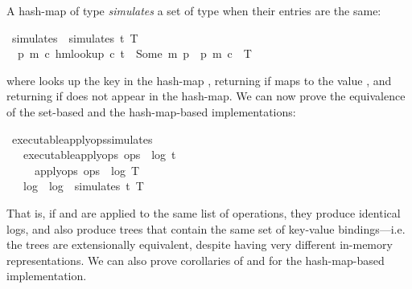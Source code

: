 \documentclass[10pt,journal,compsoc]{IEEEtran}
\renewenvironment{isabelle}{%
  \medbreak\indent%
  \renewcommand{\isanewline}{\\}%
  \begin{minipage}{\columnwidth}%
  \begin{isabellebody}%
  \begin{tabbing}%
}{%
  \end{tabbing}%
  \end{isabellebody}%
  \end{minipage}%
  \medbreak%
}
\renewcommand{\isacartoucheopen}{}
\renewcommand{\isacartoucheclose}{}
\begin{document}
A hash-map  of type  \emph{simulates} a set  of type  when their entries are the same:
\begin{isabelle}
\isamarkupfalse%
\ simulates\ \ {\isacartoucheopen}simulates\ t\ T\ {\isasymequiv}\isanewline
\ \ {\isacharparenleft}{\isasymforall}p\ m\ c{\isachardot}\ hm{\isachardot}lookup\ c\ t\ {\isacharequal}\ Some\ {\isacharparenleft}m{\isacharcomma}\ p{\isacharparenright}\ {\isasymlongleftrightarrow}\ {\isacharparenleft}p{\isacharcomma}\ m{\isacharcomma}\ c{\isacharparenright}\ {\isasymin}\ T{\isacharparenright}{\isacartoucheclose}
\end{isabelle}
\noindent where  looks up the key  in the hash-map , returning  if  maps to the value , and returning  if  does not appear in the hash-map.
We can now prove the equivalence of the set-based and the hash-map-based implementations:
\begin{isabelle}
\isamarkupfalse%
\ executable{\isacharunderscore}apply{\isacharunderscore}ops{\isacharunderscore}simulates{\isacharcolon}\isanewline
\ \ \ {\isacartoucheopen}executable{\isacharunderscore}apply{\isacharunderscore}ops\ ops\ {\isacharequal}\ {\isacharparenleft}log{}{\isacharcomma}\ t{\isacharparenright}{\isacartoucheclose}\isanewline
\ \ \ \ \ {\isacartoucheopen}apply{\isacharunderscore}ops\ ops\ {\isacharequal}\ {\isacharparenleft}log{}{\isacharcomma}\ T{\isacharparenright}{\isacartoucheclose}\isanewline
\ \ \ {\isacartoucheopen}log{}\ {\isacharequal}\ log{}\ {\isasymand}\ simulates\ t\ T{\isacartoucheclose}
\end{isabelle}

That is, if  and  are applied to the same list of operations, they produce identical logs, and also produce trees that contain the same set of key-value bindings---i.e. the trees are extensionally equivalent, despite having very different in-memory representations.
We can also prove corollaries of  and  for the hash-map-based implementation.
\end{document}
